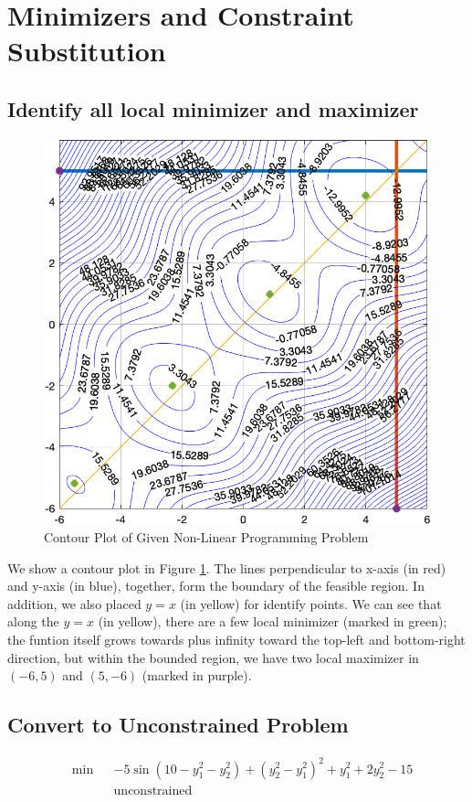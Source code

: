 \section{Minimizers and Constraint Substitution}

\subsection{Identify all local minimizer and maximizer}

\begin{figure}
    \centering
    \includegraphics[width=0.5\linewidth]{hw3/prob6_plot.png}
    \caption{Contour Plot of Given Non-Linear Programming Problem}
    \label{fig:hw3_prob6_contour}
\end{figure}


We show a contour plot in Figure \ref{fig:hw3_prob6_contour}. The lines perpendicular to x-axis (in red) and y-axis (in blue), together, form the boundary of the feasible region. In addition, we also placed $y=x$ (in yellow) for identify points. We can see that along the $y=x$ (in yellow), there are a few local minimizer (marked in green); the funtion itself grows towards plus infinity toward the top-left and bottom-right direction, but within the bounded region, we have two local maximizer in $(-6, 5)$ and $(5, -6)$ (marked in purple).

\subsection{Convert to Unconstrained Problem}

\begin{align*}
&\min&& -5\sin(10-y_1^2 - y_2^2) + (y_2^2-y_1^2)^2+y_1^2+2y_2^2-15\\
&&& \text{unconstrained}
\end{align*}


